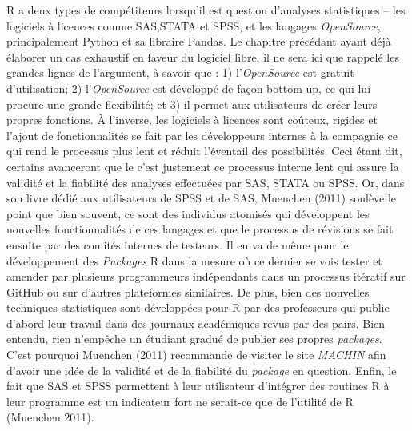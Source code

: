 \documentclass[
  letterpaper,
]{scrbook}
\begin{document}
R a deux types de compétiteurs lorsqu'il est question d'analyses
statistiques -- les logiciels à licences comme SAS,STATA et SPSS, et les
langages \emph{OpenSource}, principalement Python et sa libraire Pandas.
Le chapitre précédant ayant déjà élaborer un cas exhaustif en faveur du
logiciel libre, il ne sera ici que rappelé les grandes lignes de
l'argument, à savoir que : 1) l'\emph{OpenSource} est gratuit
d'utilisation; 2) l'\emph{OpenSource} est développé de façon bottom-up,
ce qui lui procure une grande flexibilité; et 3) il permet aux
utilisateurs de créer leurs propres fonctions. À l'inverse, les
logiciels à licences sont coûteux, rigides et l'ajout de fonctionnalités
se fait par les développeurs internes à la compagnie ce qui rend le
processus plus lent et réduit l'éventail des possibilités. Ceci étant
dit, certains avanceront que le c'est justement ce processus interne
lent qui assure la validité et la fiabilité des analyses effectuées par
SAS, STATA ou SPSS. Or, dans son livre dédié aux utilisateurs de SPSS et
de SAS, Muenchen (2011) soulève le point que bien souvent, ce sont des
individus atomisés qui développent les nouvelles fonctionnalités de ces
langages et que le processus de révisions se fait ensuite par des
comités internes de testeurs. Il en va de même pour le développement des
\emph{Packages} R dans la mesure où ce dernier se vois tester et amender
par plusieurs programmeurs indépendants dans un processus itératif sur
GitHub ou sur d'autres plateformes similaires. De plus, bien des
nouvelles techniques statistiques sont développées pour R par des
professeurs qui publie d'abord leur travail dans des journaux
académiques revus par des pairs. Bien entendu, rien n'empêche un
étudiant gradué de publier ses propres \emph{packages}. C'est pourquoi
Muenchen (2011) recommande de visiter le site \emph{MACHIN} afin d'avoir
une idée de la validité et de la fiabilité du \emph{package} en
question. Enfin, le fait que SAS et SPSS permettent à leur utilisateur
d'intégrer des routines R à leur programme est un indicateur fort ne
serait-ce que de l'utilité de R (Muenchen 2011).
\end{document}
